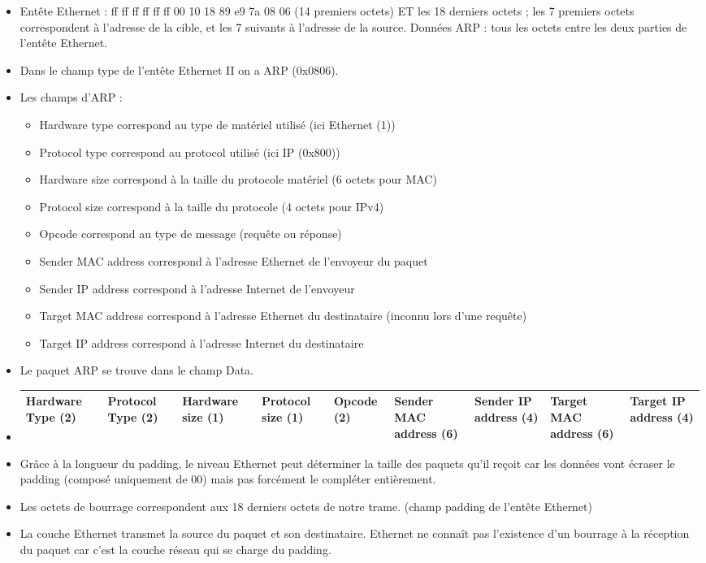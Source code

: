 \documentclass{article}
\begin{document}
\begin{itemize}\renewcommand{\labelitemi}{$\bullet$}

	\item Entête Ethernet : ff ff ff ff ff ff 00 10 18 89 e9 7a 08 06 (14 premiers octets) ET les 18 derniers octets ; les 7 premiers octets correspondent à l'adresse de la cible, et les 7 suivants à l'adresse de la source.
Données ARP : tous les octets entre les deux parties de l'entête Ethernet.
	\item Dans le champ type de l'entête Ethernet II on a ARP (0x0806).
	\item Les champs d'ARP :
	\begin{itemize}\renewcommand{\labelitemi}{$\bullet$}
		\item Hardware type correspond au type de matériel utilisé (ici Ethernet (1))
		\item Protocol type correspond au protocol utilisé (ici IP (0x800))
		\item Hardware size correspond à la taille du protocole matériel (6 octets pour MAC)
		\item Protocol size correspond à la taille du protocole (4 octets pour IPv4)
		\item Opcode correspond au type de message (requête ou réponse)
		\item Sender MAC address correspond à l'adresse Ethernet de l'envoyeur du paquet
		\item Sender IP address correspond à l'adresse Internet de l'envoyeur
		\item Target MAC address correspond à l'adresse Ethernet du destinataire (inconnu lors d'une requête)
		\item Target IP address correspond à l'adresse Internet du destinataire
	\end{itemize}
	\item Le paquet ARP se trouve dans le champ Data.
	\item 

\begin{tabular}{|p{1.3cm}|p{1.3cm}|p{1.3cm}|p{1.3cm}|p{1.3cm}|p{1.3cm}|p{1.3cm}|p{1.3cm}|p{1.3cm}|}
\hline
Hardware Type (2) &
Protocol Type (2) &
Hardware size (1) &
Protocol size (1) &
Opcode (2) &
Sender MAC address (6) &
Sender IP address (4) &
Target MAC address (6) &
Target IP address (4) \\
\hline
\end{tabular}

	\item Grâce à la longueur du padding, le niveau Ethernet peut déterminer la taille des paquets qu'il reçoit car les données vont écraser le padding (composé uniquement de 00) mais pas forcément le compléter entièrement.
	\item Les octets de bourrage correspondent aux 18 derniers octets de notre trame. (champ padding de l'entête Ethernet)
	\item La couche Ethernet transmet la source du paquet et son destinataire. Ethernet ne connaît pas l'existence d'un bourrage à la réception du paquet car c'est la couche réseau qui se charge du  padding.
\end{itemize}
\end{document}
